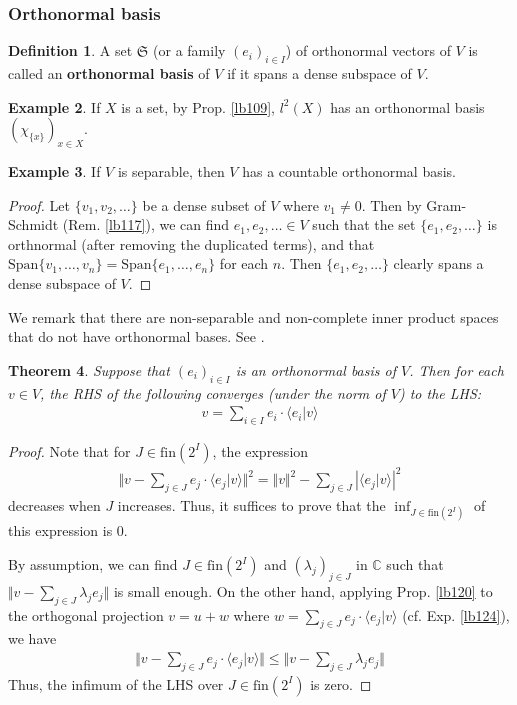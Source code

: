 \documentclass[12pt,b5paper,notitlepage]{article}
\theoremstyle{definition}
\newtheorem{df}{Definition}[subsection]
\newtheorem{eg}[df]{Example}
\theoremstyle{plain}
\newtheorem{thm}[df]{Theorem}
\newcommand{\fk}{\mathfrak}
\newcommand{\Span}{\mathrm{Span}}
\newcommand{\bk}[1]{\langle {#1}\rangle}
\newcommand{\Cbb}{\mathbb C}
\newcommand{\fin}{\mathrm{fin}}
\numberwithin{equation}{section}
\begin{document}
\subsubsection{Orthonormal basis}



\begin{df}\label{lb121}
A set $\fk S$ (or a family $(e_i)_{i\in I}$) of orthonormal vectors of $V$ is called an \textbf{orthonormal basis}  of $V$ if it spans a dense subspace of $V$.  
\end{df}

\begin{eg}
If $X$ is a set, by Prop. \ref{lb109}, $l^2(X)$ has an orthonormal basis $(\chi_{\{x\}})_{x\in X}$.
\end{eg}


\begin{eg}\label{lb122}
If $V$ is separable, then $V$ has a countable orthonormal basis.
\end{eg}

\begin{proof}
Let $\{v_1,v_2,\dots\}$ be a dense subset of $V$ where $v_1\neq 0$. Then by Gram-Schmidt (Rem. \ref{lb117}), we can find $e_1,e_2,\dots\in V$ such that the set $\{e_1,e_2,\dots\}$ is orthnormal (after removing the duplicated terms), and that $\Span\{v_1,\dots,v_n\}=\Span\{e_1,\dots,e_n\}$ for each $n$. Then $\{e_1,e_2,\dots\}$ clearly spans a dense subspace of $V$.
\end{proof}

We remark that there are non-separable and non-complete inner product spaces that do not have orthonormal bases. See \cite{Gud74}.


\begin{thm}\label{lb123}
Suppose that $(e_i)_{i\in I}$ is an orthonormal basis of $V$. Then for each $v\in V$, the RHS of the following converges (under the norm of $V$) to the LHS:
\begin{align}
v=\sum_{i\in I}e_i\cdot\bk{e_i|v}
\end{align}
\end{thm}

\begin{proof}
Note that for $J\in\fin(2^I)$, the expression
\begin{align*}
\Big\Vert v-\sum_{j\in J}e_j\cdot\bk{e_j|v}\Big\Vert^2=\Vert v\Vert^2-\sum_{j\in J}|\bk{e_j|v}|^2
\end{align*}
decreases when $J$ increases. Thus, it suffices to prove that the $\inf_{J\in \fin(2^I)}$ of this expression is $0$. 

By assumption,  we can find $J\in\fin(2^I)$ and $(\lambda_j)_{j\in J}$ in $\Cbb$ such that $\Vert v-\sum_{j\in J}\lambda_je_j\Vert$ is small enough. On the other hand, applying Prop. \ref{lb120} to the orthogonal projection $v=u+w$ where $w=\sum_{j\in J}e_j\cdot\bk{e_j|v}$ (cf. Exp. \ref{lb124}), we have
\begin{align}
\Big\Vert v-\sum_{j\in J}e_j\cdot\bk{e_j|v}\Big\Vert\leq \Big\Vert v-\sum_{j\in J}\lambda_je_j\Big\Vert
\end{align}
Thus, the infimum of the LHS over $J\in\fin(2^I)$ is zero.
\end{proof}
\end{document}
